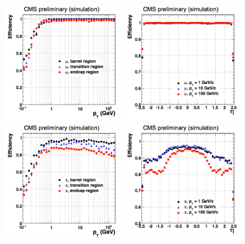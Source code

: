 \begin{figure}[!Hhtbp]
  \begin{center}
    \includegraphics[width=0.45\textwidth]{figs/eff_muon_vs_pt.png}
    \includegraphics[width=0.45\textwidth]{figs/eff_muon_vs_eta.png}
    \includegraphics[width=0.45\textwidth]{figs/eff_pion_vs_pt.png}
    \includegraphics[width=0.45\textwidth]{figs/eff_pion_vs_eta.png}
    \caption{}
    \label{fig:TrackerEff}
  \end{center}
\end{figure}

